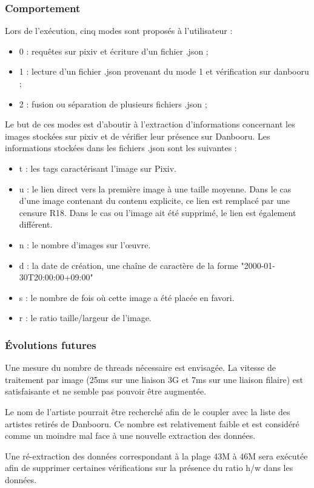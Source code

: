 \documentclass[a4paper,12pt]{article}
\begin{document}
\subsubsection{Comportement}
Lors de l'exécution, cinq modes sont proposés à l'utilisateur :
\begin{itemize}
\item 0 : requêtes sur pixiv et écriture d'un fichier .json ;
\item 1 : lecture d'un fichier .json provenant du mode 1 et vérification sur danbooru ;
\item 2 : fusion ou séparation de plusieurs fichiers .json ;
\end{itemize}

Le but de ces modes est d'aboutir à l'extraction d'informations concernant les images stockées sur pixiv et de vérifier leur présence sur Danbooru. 
Les informations stockées dans les fichiers .json sont les suivantes :
\begin{itemize}
\item t : les tags caractérisant l'image sur Pixiv.
\item u : le lien direct vers la première image à une taille moyenne. Dans le cas d'une image contenant du contenu explicite, ce lien est remplacé par une censure R18. Dans le cas ou l'image ait été supprimé, le lien est également différent.
\item n : le nombre d'images sur l'œuvre.
\item d : la date de création, une chaîne de caractère de la forme "2000-01-30T20:00:00+09:00"
\item s : le nombre de fois où cette image a été placée en favori.
\item r : le ratio taille/largeur de l'image.
\end{itemize}
\subsubsection{Évolutions futures}
Une mesure du nombre de threads nécessaire est envisagée. La vitesse de traitement par image (25ms sur une liaison 3G et 7ms sur une liaison filaire) est satisfaisante et ne semble pas pouvoir être augmentée.

Le nom de l'artiste pourrait être recherché afin de le coupler avec la liste des artistes retirés de Danbooru. Ce nombre est relativement faible et est considéré comme un moindre mal face à une nouvelle extraction des données.

Une ré-extraction des données correspondant à la plage 43M à 46M sera exécutée afin de supprimer certaines vérifications sur la présence du ratio h/w dans les données.
\end{document}
